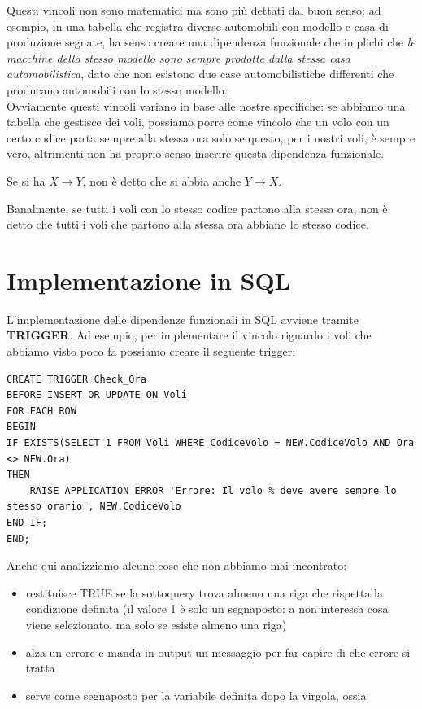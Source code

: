 \documentclass[11pt, a4paper, titlepage, oneside]{scrbook}
\begin{document}
Questi vincoli non sono matematici ma sono più dettati dal buon senso: ad esempio, in una tabella che registra diverse automobili con modello e casa di produzione segnate, ha senso creare una dipendenza funzionale che implichi che \textit{le macchine dello stesso modello sono sempre prodotte dalla stessa casa automobilistica}, dato che non esistono due case automobilistiche differenti che producano automobili con lo stesso modello. \\
Ovviamente questi vincoli variano in base alle nostre specifiche: se abbiamo una tabella che gestisce dei voli, possiamo porre come vincolo che un volo con un certo codice parta sempre alla stessa ora solo se questo, per i nostri voli, è sempre vero, altrimenti non ha proprio senso inserire questa dipendenza funzionale. 

\begin{Osservazione}[]
\label{oss-dipendenze-funzionali}
Se si ha $X \longrightarrow Y$, non è detto che si abbia anche $Y \longrightarrow X$.
\end{Osservazione}

Banalmente, se tutti i voli con lo stesso codice partono alla stessa ora, non è detto che tutti i voli che partono alla stessa ora abbiano lo stesso codice.

\section{Implementazione in SQL}

L'implementazione delle dipendenze funzionali in SQL avviene tramite \textbf{TRIGGER}. Ad esempio, per implementare il vincolo riguardo i voli che abbiamo visto poco fa possiamo creare il seguente trigger:
\begin{lstlisting}
CREATE TRIGGER Check_Ora
BEFORE INSERT OR UPDATE ON Voli
FOR EACH ROW
BEGIN
IF EXISTS(SELECT 1 FROM Voli WHERE CodiceVolo = NEW.CodiceVolo AND Ora <> NEW.Ora)
THEN
    RAISE APPLICATION ERROR 'Errore: Il volo % deve avere sempre lo stesso orario', NEW.CodiceVolo
END IF;
END;
\end{lstlisting}

Anche qui analizziamo alcune cose che non abbiamo mai incontrato:
\begin{itemize}
    \item {} restituisce TRUE se la sottoquery trova almeno una riga che rispetta la condizione definita (il valore 1 è solo un segnaposto: a  non interessa cosa viene selezionato, ma solo se esiste almeno una riga)
    \item {} alza un errore e manda in output un messaggio per far capire di che errore si tratta
    \item \codeb{\%} serve come segnaposto per la variabile definita dopo la virgola, ossia 
\end{itemize}
\end{document}
